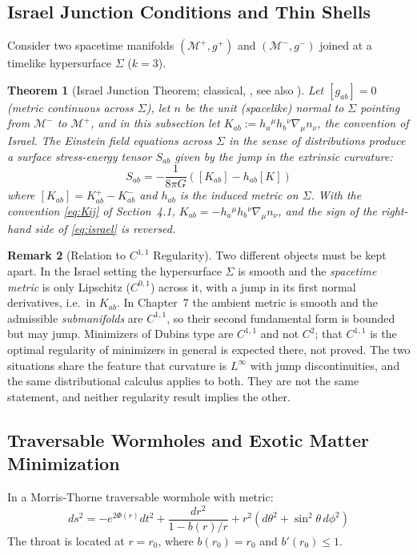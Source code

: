 \documentclass[11pt,reqno]{amsart}
\newtheorem{theorem}{Theorem}[section]
\theoremstyle{definition}
\newtheorem{remark}[theorem]{Remark}
\numberwithin{equation}{section}
\begin{document}
\subsection{Israel Junction Conditions and Thin Shells}
Consider two spacetime manifolds $(\mathcal{M}^+, g^+)$ and $(\mathcal{M}^-, g^-)$ joined at a timelike hypersurface $\Sigma$ ($k=3$).

\begin{theorem}[Israel Junction Theorem; classical, \cite{israel1966}, see also \cite{mars1993}]
\label{thm:israel_junction}
Let $[g_{ab}] = 0$ (metric continuous across $\Sigma$), let $n$ be the unit (spacelike) normal to $\Sigma$ pointing from $\mathcal{M}^-$ to $\mathcal{M}^+$, and in this subsection let $K_{ab} := h_a{}^\mu h_b{}^\nu \nabla_\mu n_\nu$, the convention of Israel. The Einstein field equations across $\Sigma$ in the sense of distributions produce a surface stress-energy tensor $S_{ab}$ given by the jump in the extrinsic curvature:
\begin{equation}
\label{eq:israel}
S_{ab} = -\frac{1}{8\pi G} \left( [K_{ab}] - h_{ab} [K] \right)
\end{equation}
where $[K_{ab}] = K_{ab}^+ - K_{ab}^-$ and $h_{ab}$ is the induced metric on $\Sigma$. With the convention \eqref{eq:Kij} of Section~4.1, $K_{ab} = -h_a{}^\mu h_b{}^\nu \nabla_\mu n_\nu$, and the sign of the right-hand side of \eqref{eq:israel} is reversed.
\end{theorem}

\begin{remark}[Relation to $C^{1,1}$ Regularity]
Two different objects must be kept apart. In the Israel setting the hypersurface $\Sigma$ is smooth and the \emph{spacetime metric} is only Lipschitz ($C^{0,1}$) across it, with a jump in its first normal derivatives, i.e.\ in $K_{ab}$. In Chapter~7 \cite{silvafilho2026minimax} the ambient metric is smooth and the admissible \emph{submanifolds} are $C^{1,1}$, so their second fundamental form is bounded but may jump. Minimizers of Dubins type are $C^{1,1}$ and not $C^2$; that $C^{1,1}$ is the optimal regularity of minimizers in general is expected there, not proved. The two situations share the feature that curvature is $L^\infty$ with jump discontinuities, and the same distributional calculus applies to both. They are not the same statement, and neither regularity result implies the other.
\end{remark}

\subsection{Traversable Wormholes and Exotic Matter Minimization}
In a Morris-Thorne traversable wormhole with metric:
\begin{equation}
ds^2 = -e^{2\Phi(r)} dt^2 + \frac{dr^2}{1 - b(r)/r} + r^2 (d\theta^2 + \sin^2\theta \, d\phi^2)
\end{equation}
The throat is located at $r = r_0$, where $b(r_0) = r_0$ and $b'(r_0) \le 1$.
\end{document}
